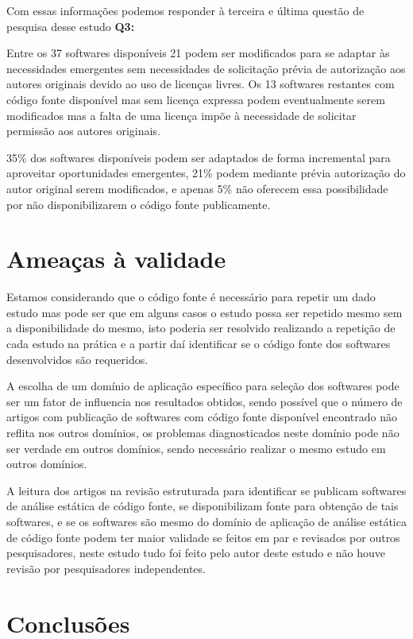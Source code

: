 Com essas informações podemos responder à terceira e última questão de
pesquisa desse estudo {\bf Q3:} \QuestaoTres

Entre os 37 softwares disponíveis 21 podem ser modificados para se adaptar às
necessidades emergentes sem necessidades de solicitação prévia de autorização
aos autores originais devido ao uso de licenças livres. Os 13 softwares
restantes com código fonte disponível mas sem licença expressa podem
eventualmente serem modificados mas a falta de uma licença impõe à necessidade
de solicitar permissão aos autores originais.

35\% dos softwares disponíveis podem ser adaptados de forma incremental para
aproveitar oportunidades emergentes, 21\% podem mediante prévia autorização do
autor original serem modificados, e apenas 5\% não oferecem essa possibilidade
por não disponibilizarem o código fonte publicamente.

\section{Ameaças à validade}

Estamos considerando que o código fonte é necessário para repetir um dado
estudo mas pode ser que em alguns casos o estudo possa ser repetido mesmo sem a
disponibilidade do mesmo, isto poderia ser resolvido realizando a repetição
de cada estudo na prática e a partir daí identificar se o código fonte dos
softwares desenvolvidos são requeridos.

A escolha de um domínio de aplicação específico para seleção dos softwares
pode ser um fator de influencia nos resultados obtidos, sendo possível que
o número de artigos com publicação de softwares com código fonte disponível
encontrado não reflita nos outros domínios, os problemas diagnosticados
neste domínio pode não ser verdade em outros domínios, sendo necessário
realizar o mesmo estudo em outros domínios.

A leitura dos artigos na revisão estruturada para identificar se publicam
softwares de análise estática de código fonte, se disponibilizam fonte para
obtenção de tais softwares, e se os softwares são mesmo do domínio de aplicação
de análise estática de código fonte podem ter maior validade se feitos em
par e revisados por outros pesquisadores, neste estudo tudo foi feito pelo
autor deste estudo e não houve revisão por pesquisadores independentes.

\section{Conclusões}

